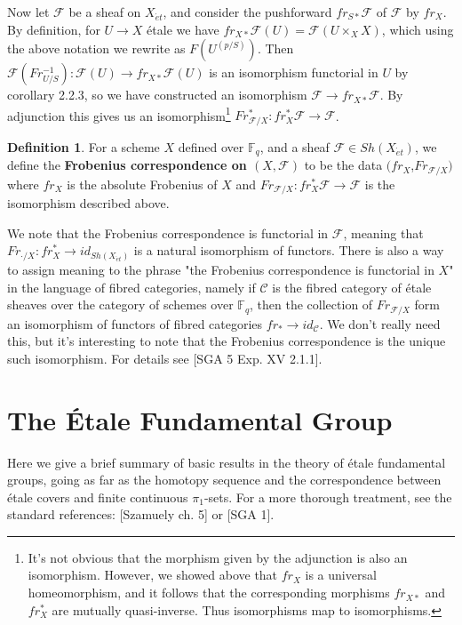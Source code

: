 \documentclass{ucbthesis}
\theoremstyle{definition}
\newtheorem{defn}[thm]{Definition}
\theoremstyle{theorem}
\begin{document}
Now let $\mathcal{F}$ be a sheaf on $X_{\acute{e}t}$, and consider the pushforward $fr_{S*}\mathcal{F}$ of $\mathcal{F}$
 by $fr_{X}$. By definition, for $U\rightarrow X$ \'{e}tale we have $fr_{X*}\mathcal{F}(U) = \mathcal{F}(U\times_{X}X)$,
  which using the above notation we rewrite as $F(U^{(p/S)})$. Then $\mathcal{F}(Fr_{U/S}^{-1}): \mathcal{F}(U) \rightarrow
   fr_{X*}\mathcal{F}(U)$ is an isomorphism functorial in $U$ by corollary 2.2.3, so we have constructed an isomorphism $\mathcal{F}
    \rightarrow fr_{X*}\mathcal{F}$. By adjunction this gives us an isomorphism\footnote{It's not obvious that the morphism given by the adjunction is also an isomorphism. However, we showed above that $fr_{X}$ is a universal homeomorphism, and it follows that the corresponding morphisms $fr_{X*}$ and $fr_{X}^{*}$ are mutually quasi-inverse. Thus isomorphisms map to isomorphisms.}
$Fr_{\mathcal{F}/X}^{*}:fr_{X}^{*}\mathcal{F} \rightarrow \mathcal{F}$. 

\begin{defn}
For a scheme $X$ defined over $\mathbb{F}_{q}$, and a sheaf $\mathcal{F}\in Sh(X_{\acute{e}t})$, we define the \textbf{Frobenius correspondence on $(X,\mathcal{F})$} to be the data $(fr_{X}$,$Fr_{\mathcal{F}/X})$ where $fr_{X}$ is the absolute Frobenius of $X$ and $Fr_{\mathcal{F}/X}: fr_{X}^{*}\mathcal{F} \rightarrow \mathcal{F}$ is the isomorphism described above. 
\end{defn}

We note that the Frobenius correspondence is functorial in $\mathcal{F}$, meaning that $Fr_{\cdot/X} :fr_{X}^{*} \rightarrow id_{Sh(X_{\acute{e}t})}$ is a natural isomorphism of functors. There is also a way to assign meaning to the phrase "the Frobenius correspondence is functorial in $X$" in the language of fibred categories, namely if $\mathcal{C}$ is the fibred category of \'e{t}ale sheaves over the category of schemes over $\mathbb{F}_{q}$, then the collection of $Fr_{\mathcal{F}/X}$ form an isomorphism of functors of fibred categories $fr_{*}\rightarrow id_{\mathcal{C}}$. We don't really need this, but it's interesting to note that the Frobenius correspondence is the unique such isomorphism. For details see [SGA 5 Exp. XV 2.1.1].  

\section{The \'{E}tale Fundamental Group}

Here we give a brief summary of basic results in the theory of \'{e}tale fundamental groups, going as far as the homotopy sequence and the correspondence between \'{e}tale covers and finite continuous $\pi_{1}$-sets.
For a more thorough treatment, see the standard references: [Szamuely ch. 5] or [SGA 1].
\end{document}
